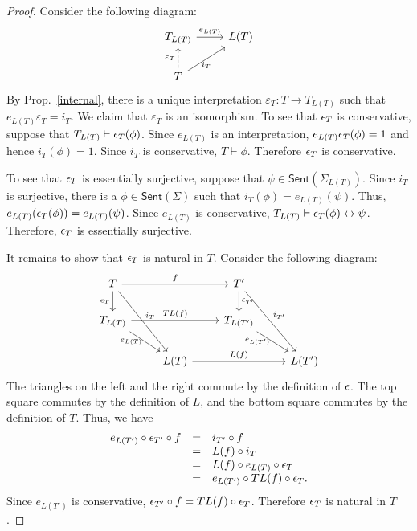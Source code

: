 \begin{proof} Consider the following diagram:
\[ \begin{tikzcd}
T_{L(T)} \arrow{r}{e_{L(T)}} & L(T) \\
T \arrow[dashed]{u}{\varepsilon _T} \arrow{ur}[below]{i_T}  
\end{tikzcd} \] By Prop.\ \ref{internal}, there is a unique
interpretation $\varepsilon _T:T\to T_{L(T)}$ such that
$e_{L(T)}\varepsilon _T=i_T$.  We claim that $\varepsilon _T$ is an
isomorphism.  To see that $\epsilon _T$ is conservative, suppose that
$T_{L(T)}\vdash \epsilon _T(\phi )$.  Since $e_{L(T)}$ is an
interpretation, $e_{L(T)}\epsilon _T (\phi )=1$ and hence $i_T(\phi )=1$.
Since $i_T$ is conservative, $T\vdash \phi$.  Therefore $\epsilon _T$ is
conservative.  

To see that $\epsilon _T$ is essentially surjective, suppose that $\psi\in
\mathsf{Sent}(\Sigma _{L(T)})$.  Since $i_T$ is surjective, there is a
$\phi\in \mathsf{Sent}(\Sigma )$ such that $i_T(\phi )=e_{L(T)}(\psi
)$.  Thus, $e_{L(T)}(\epsilon _T(\phi ))=e_{L(T)}(\psi )$.  Since
$e_{L(T)}$ is conservative, $T_{L(T)}\vdash \epsilon _T(\phi)\leftrightarrow \psi$.
Therefore, $\epsilon _T$ is essentially surjective.

It remains to show that $\epsilon _T$ is natural in $T$.  Consider the
following diagram:
\[ \begin{tikzcd}
T \arrow{d}[left]{\ve _T} \arrow{rr}{f} \arrow{ddr}{i_T} & &  T'
\arrow{d}{\ve _{T'}} \arrow{ddr}{i_{T'}} \\
T_{L(T)} \arrow{rr}{TL(f)} \arrow{dr}[left]{e_{L(T)}} & & T_{L(T')}
  \arrow{dr}[left]{e_{L(T')}} \\
& L(T) \arrow{rr}{L(f)} & & L(T') \end{tikzcd} \] 
The triangles on the left and the right commute by the definition of
$\epsilon$.  The top square commutes by the definition of $L$, and the
bottom square commutes by the definition of $T$.  Thus, we have
\[ \begin{array}{l l l} e_{L(T')}\circ \epsilon _{T'}\circ f & = & i_{T'}\circ f \\
& = & L(f)\circ i_T \\
& = & L(f)\circ e_{L(T)}\circ \epsilon _T \\
& = & e_{L(T')}\circ TL(f)\circ \epsilon _T .\end{array} \]
Since $e_{L(T')}$ is conservative, $\epsilon _{T'}\circ f=TL(f)\circ \epsilon
_T$.  Therefore $\epsilon _T$ is natural in $T$.  
\end{proof}

